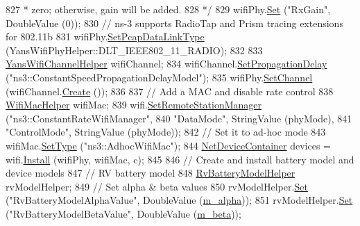 \begin{DoxyCode}
827 \textcolor{comment}{   * zero; otherwise, gain will be added.}
828 \textcolor{comment}{   */}
829   wifiPhy.\hyperlink{classns3_1_1WifiPhyHelper_a2527d6d7b29f717fd7436166c5f05f1a}{Set} (\textcolor{stringliteral}{"RxGain"}, DoubleValue (0));
830   \textcolor{comment}{// ns-3 supports RadioTap and Prism tracing extensions for 802.11b}
831   wifiPhy.\hyperlink{classns3_1_1WifiPhyHelper_ae4b90e90f6e78a19c1b7fdf08b270218}{SetPcapDataLinkType} (YansWifiPhyHelper::DLT\_IEEE802\_11\_RADIO);
832 
833   \hyperlink{classns3_1_1YansWifiChannelHelper}{YansWifiChannelHelper} wifiChannel;
834   wifiChannel.\hyperlink{classns3_1_1YansWifiChannelHelper_a6b452ba53ccaee6ca000cc72ed9ea0fa}{SetPropagationDelay} (\textcolor{stringliteral}{"ns3::ConstantSpeedPropagationDelayModel"});
835   wifiPhy.\hyperlink{classns3_1_1YansWifiPhyHelper_ad2e9a27587dd4ff320435c93cc2676de}{SetChannel} (wifiChannel.\hyperlink{classns3_1_1YansWifiChannelHelper_a0532e292ab9452f3cf630c848708e563}{Create} ());
836 
837   \textcolor{comment}{// Add a MAC and disable rate control}
838   \hyperlink{classns3_1_1WifiMacHelper}{WifiMacHelper} wifiMac;
839   wifi.\hyperlink{classns3_1_1WifiHelper_a3d01b178aeb2de246ab5a3aa5638ce24}{SetRemoteStationManager} (\textcolor{stringliteral}{"ns3::ConstantRateWifiManager"},
840                                 \textcolor{stringliteral}{"DataMode"}, StringValue (phyMode),
841                                 \textcolor{stringliteral}{"ControlMode"}, StringValue (phyMode));
842   \textcolor{comment}{// Set it to ad-hoc mode}
843   wifiMac.\hyperlink{classns3_1_1WifiMacHelper_a382d8df76a1dd7007179d1963b4b6bc6}{SetType} (\textcolor{stringliteral}{"ns3::AdhocWifiMac"});
844   \hyperlink{classns3_1_1NetDeviceContainer}{NetDeviceContainer} devices = wifi.\hyperlink{classns3_1_1WifiHelper_a451b3d33fa1497c22f06c5451f57a127}{Install} (wifiPhy, wifiMac, c);
845 
846   \textcolor{comment}{// Create and install battery model and device models}
847   \textcolor{comment}{// RV battery model}
848   \hyperlink{classns3_1_1RvBatteryModelHelper}{RvBatteryModelHelper} rvModelHelper;
849   \textcolor{comment}{// Set alpha & beta values}
850   rvModelHelper.\hyperlink{classns3_1_1RvBatteryModelHelper_a28f5eedc180d45310324ca3bd1868af1}{Set} (\textcolor{stringliteral}{"RvBatteryModelAlphaValue"}, DoubleValue (\hyperlink{classBatteryLifetimeTest_ab0ea71a3ce518e4876ee4a0efe8a967c}{m\_alpha}));
851   rvModelHelper.\hyperlink{classns3_1_1RvBatteryModelHelper_a28f5eedc180d45310324ca3bd1868af1}{Set} (\textcolor{stringliteral}{"RvBatteryModelBetaValue"}, DoubleValue (\hyperlink{classBatteryLifetimeTest_a7e071f34e550450909e80907d59923c8}{m\_beta}));

\end{DoxyCode}
